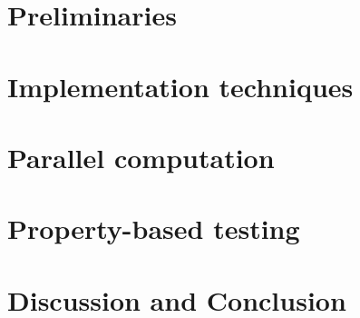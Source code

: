\documentclass[oneside]{book}
\begin{document}
\part{Preliminaries}
\label{part:preliminaries}




\epigraphhead[450]{}
\part{Implementation techniques}
\label{part:implementation}



\epigraphhead[450]{}
\part{Parallel computation}
\label{part:parallel}


\epigraphhead[450]{}
\part{Property-based testing}
\label{part:property}


\epigraphhead[450]{}
\part{Discussion and Conclusion}
\label{part:discussion}



\renewcommand\bibname{References}



\end{document}
